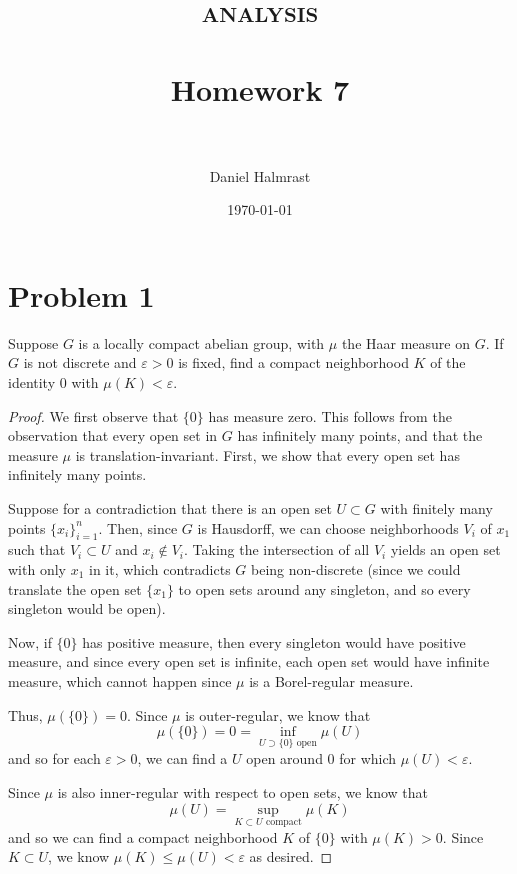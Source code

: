 \documentclass[fontsize=11pt]{scrartcl} %
\title{	
\normalfont \normalsize 
\textsc{analysis} \\ [25pt] %
\horrule{0.5pt} \\[0.4cm] %
\huge Homework 7 \\ %
\horrule{2pt} \\[0.5cm] %
}
\author{Daniel Halmrast} %
\date{\normalsize\today} %
\numberwithin{equation}{section} %
\numberwithin{figure}{section} %
\numberwithin{table}{section} %
\begin{document}
\maketitle %

\section*{Problem 1}
Suppose $G$ is a locally compact abelian group, with $\mu$ the Haar measure on
$G$. If $G$ is not discrete and $\varepsilon>0$ is fixed, find a compact
neighborhood $K$ of the identity $0$ with $\mu(K)<\varepsilon$.

\begin{proof}
    We first observe that $\{0\}$ has measure zero. This follows from the
    observation that every open set in $G$ has infinitely many points, and that
    the measure $\mu$ is translation-invariant. First, we show that every open
    set has infinitely many points.

    Suppose for a contradiction that there is an open set $U\subset G$ with
    finitely many points $\{x_i\}_{i=1}^n$. Then, since $G$ is Hausdorff, we can
    choose neighborhoods $V_i$ of $x_1$ such that $V_i\subset U$ and $x_i\not\in
    V_i$. Taking the intersection of all $V_i$ yields an open set with only
    $x_1$ in it, which contradicts $G$ being non-discrete (since we could
        translate the open set $\{x_1\}$ to open sets around any singleton, and
    so every singleton would be open).

    Now, if $\{0\}$ has positive measure, then every singleton would have
    positive measure, and since every open set is infinite, each open set would
    have infinite measure, which cannot happen since $\mu$ is a Borel-regular
    measure.

    Thus, $\mu(\{0\})=0$. Since $\mu$ is outer-regular, we know that
    \[
        \mu(\{0\}) = 0 = \inf_{U\supset \{0\} \text{ open}}\mu(U)
    \]
    and so for each $\varepsilon>0$, we can find a $U$ open around $0$ for which
    $\mu(U)<\varepsilon$.

    Since $\mu$ is also inner-regular with respect to open sets, we know that
    \[
        \mu(U) = \sup_{K\subset U \text{ compact}}\mu(K)
    \]
    and so we can find a compact neighborhood $K$ of $\{0\}$ with $\mu(K)>0$.
    Since $K\subset U$, we know $\mu(K)\leq\mu(U)<\varepsilon$ as desired.
\end{proof}

\newpage
\end{document}
